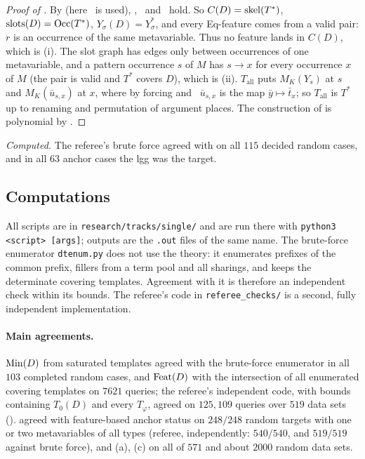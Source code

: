 \begin{proof}[Proof of ]
By  (here \Rich\ is used), \evRs, \evN\ and \evU\ hold. So $C(D)=\mathrm{skel}(T^*)$, $\mathrm{slots}(D)=\mathrm{Occ}(T^*)$, $Y_\sigma(D)=Y^*_\sigma$, and every Eq-feature comes from a valid pair: $r$ is an occurrence of the same metavariable. Thus no feature lands in $C(D)$, which is (i). The slot graph has edges only between occurrences of one metavariable, and a pattern occurrence $s$ of $M$ has $s\to x$ for every occurrence $x$ of $M$ (the pair is valid and $T^*$ covers $D$), which is (ii). $T_{\mathrm{all}}$ puts $M_K(Y_s)$ at $s$ and $M_K(\bar u_{s,x})$ at $x$, where by forcing and \evN\ $\bar u_{s,x}$ is the map $\bar y\mapsto\bar t_x$; so $T_{\mathrm{all}}$ is $T^*$ up to renaming and permutation of argument places. The construction of  is polynomial by .
\end{proof}

\noindent\emph{Computed.} The referee's brute force agreed with  on all $115$ decided random cases, and in all $63$ anchor cases the lgg was the target.

\subsection{Computations}\label{app:single:computations}

All scripts are in \texttt{research/tracks/single/} and are run there with \texttt{python3 <script> [args]}; outputs are the \texttt{.out} files of the same name. The brute-force enumerator \texttt{dtenum.py} does not use the theory: it enumerates prefixes of the common prefix, fillers from a term pool and all sharings, and keeps the determinate covering templates. Agreement with it is therefore an independent check within its bounds. The referee's code in \texttt{referee\_checks/} is a second, fully independent implementation.

\paragraph{Main agreements.} $\mathrm{Min}(D)$ from saturated templates agreed with the brute-force enumerator in all $103$ completed random cases, and $\mathrm{Feat}(D)$ with the intersection of all enumerated covering templates on $7621$ queries; the referee's independent code, with bounds containing $T_0(D)$ and every $T_\varphi$, agreed on $125{,}109$ queries over $519$ data sets ().  agreed with feature-based anchor status on $248/248$ random targets with one or two metavariables of all types (referee, independently: $540/540$, and $519/519$ against brute force), and (a), (c) on all of $571$ and about $2000$ random data sets.

